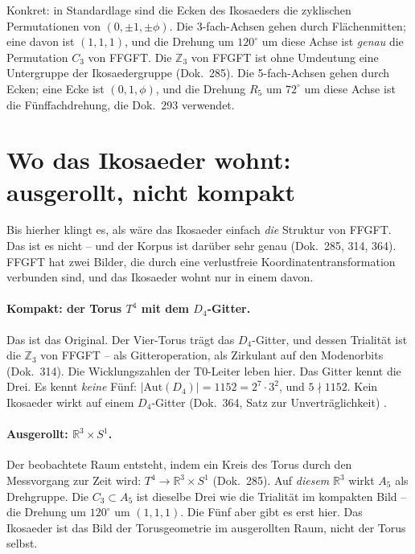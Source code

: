 Konkret: in Standardlage sind die Ecken des Ikosaeders die zyklischen
Permutationen von $(0,\pm1,\pm\phi)$. Die 3-fach-Achsen gehen durch
Flächenmitten; eine davon ist $(1,1,1)$, und die Drehung um $120^\circ$ um diese
Achse ist \emph{genau} die Permutation $C_3$ von FFGFT. Die $\mathbb{Z}_3$ von
FFGFT ist ohne Umdeutung eine Untergruppe der Ikosaedergruppe (Dok.~285). Die
5-fach-Achsen gehen durch Ecken; eine Ecke ist $(0,1,\phi)$, und die Drehung
$R_5$ um $72^\circ$ um diese Achse ist die Fünffachdrehung, die Dok.~293
verwendet.

\section{Wo das Ikosaeder wohnt: ausgerollt, nicht kompakt}

Bis hierher klingt es, als wäre das Ikosaeder einfach \emph{die} Struktur von
FFGFT. Das ist es nicht -- und der Korpus ist darüber sehr genau (Dok.~285,
314, 364). FFGFT hat zwei Bilder, die durch eine verlustfreie
Koordinatentransformation verbunden sind, und das Ikosaeder wohnt nur in
einem davon.

\paragraph{Kompakt: der Torus $T^4$ mit dem $D_4$-Gitter.}
Das ist das Original. Der Vier-Torus trägt das $D_4$-Gitter, und dessen
Trialität ist die $\mathbb{Z}_3$ von FFGFT -- als Gitteroperation, als
Zirkulant auf den Modenorbits (Dok.~314). Die Wicklungszahlen der T0-Leiter
leben hier. Das Gitter kennt die Drei. Es kennt \emph{keine} Fünf:
$|\text{Aut}(D_4)| = 1152 = 2^7\cdot3^2$, und $5\nmid1152$. Kein Ikosaeder
wirkt auf einem $D_4$-Gitter (Dok.~364, Satz zur Unverträglichkeit) \BM.

\paragraph{Ausgerollt: $\mathbb{R}^3\times S^1$.}
Der beobachtete Raum entsteht, indem ein Kreis des Torus durch den
Messvorgang zur Zeit wird: $T^4\to\mathbb{R}^3\times S^1$ (Dok.~285). Auf
\emph{diesem} $\mathbb{R}^3$ wirkt $A_5$ als Drehgruppe. Die $C_3\subset A_5$
ist dieselbe Drei wie die Trialität im kompakten Bild -- die Drehung um
$120^\circ$ um $(1,1,1)$. Die Fünf aber gibt es erst hier. Das Ikosaeder ist
das Bild der Torusgeometrie im ausgerollten Raum, nicht der Torus selbst.

